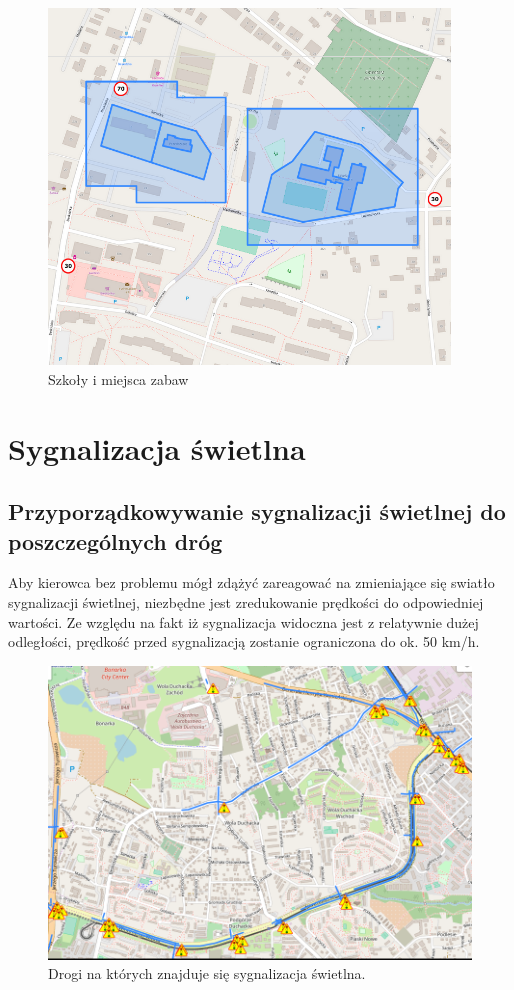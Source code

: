 \begin{figure}[h]
\caption{Szkoły i miejsca zabaw}
\label{sec:schoolsSpeed}
\centering
\includegraphics[width=0.95\textwidth]{schoolsSpeed}
\end{figure}


\newpage
\section{Sygnalizacja świetlna}
\label{sec:trafficSignalMain}
\subsection{Przyporządkowywanie sygnalizacji świetlnej do poszczególnych dróg}

Aby kierowca bez problemu mógł zdążyć zareagować na zmieniające się swiatło sygnalizacji świetlnej, niezbędne jest zredukowanie prędkości do odpowiedniej wartości. Ze względu na fakt iż sygnalizacja widoczna jest z relatywnie dużej odległości, prędkość przed sygnalizacją zostanie ograniczona do ok. 50 km/h.


\begin{figure}[h]
\caption{Drogi na których znajduje się sygnalizacja świetlna.}
\label{sec:PrzejazdyKolejowe2}
\centering
\includegraphics[width=1.1\textwidth]{traffic_sight}
\end{figure}

